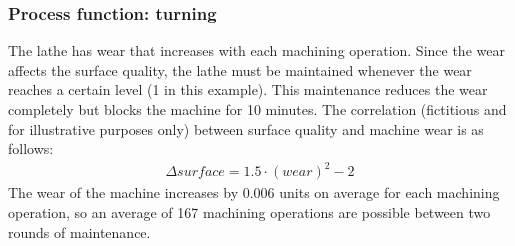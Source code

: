 \documentclass[letterpaper,10pt,english]{sphinxmanual}
\begin{document}
\subsubsection{Process function: turning}
\label{\detokenize{source/Examples/example02:process-function-turning}}\label{\detokenize{source/Examples/example02:turning}}
\sphinxAtStartPar
The lathe has wear that increases with each machining operation. Since the wear affects the surface quality, the lathe
must be maintained whenever the wear reaches a certain level (1 in this example). This maintenance reduces the wear
completely but blocks the machine for 10 minutes. The correlation (fictitious and for illustrative purposes only)
between surface quality and machine wear is as follows:
\begin{equation*}
\begin{split}\Delta surface = 1.5\cdot(wear)^{2} - 2\end{split}
\end{equation*}
\sphinxAtStartPar
The wear of the machine increases by 0.006 units on average for each machining operation, so an average of 167 machining
operations are possible between two rounds of maintenance.

\begin{sphinxVerbatim}[commandchars=\\\{\}]
    

       
          
         

        

      

     
\end{sphinxVerbatim}
\end{document}
